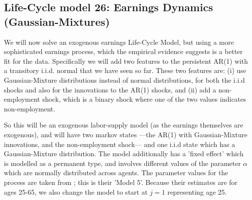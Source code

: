 \subsection{Life-Cycle model 26: Earnings Dynamics (Gaussian-Mixtures)}
We will now solve an exogenous earnings Life-Cycle Model, but using a more sophisticated earnings process, which the empirical evidence suggests is a better fit for the data. Specifically we will add two features to the persistent AR(1) with a transitory i.i.d. normal that we have seen so far. These two features are: (i) use Gaussian-Mixture distributions instead of normal distributions, for both the i.i.d shocks and also for the innovations to the AR(1) shocks, and (ii) add a non-employment shock, which is a binary shock where one of the two values indicates non-employment.

So this will be an exogenous labor-supply model (as the earnings themselves are exogenous), and will have two markov states ---the AR(1) with Gaussian-Mixture innovations, and the non-employment shock--- and one i.i.d state which has a Gaussian-Mixture distribution. The model additionally has a 'fixed effect' which is modelled as a permanent type, and involves different values of the parameter $\alpha$ which are normally distributed across agents. The parameter values for the process are taken from \cite*{GuvenenKarahanOzkanSong2021}; this is their 'Model 5'. Because their estimates are for ages 25-65, we also change the model to start at $j=1$ representing age 25.

